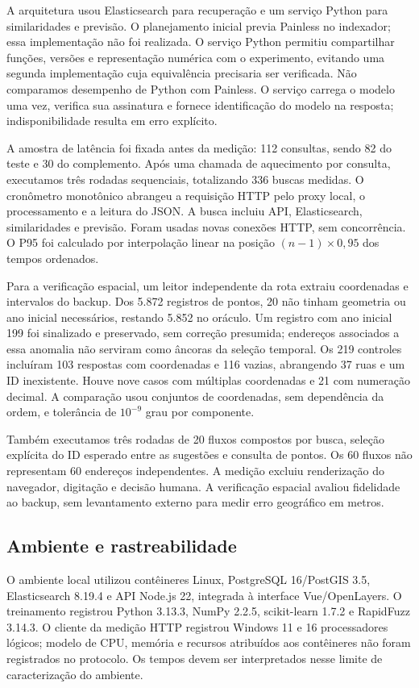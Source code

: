 A arquitetura usou Elasticsearch para recuperação e um serviço Python para similaridades e previsão. O planejamento inicial previa Painless no indexador; essa implementação não foi realizada. O serviço Python permitiu compartilhar funções, versões e representação numérica com o experimento, evitando uma segunda implementação cuja equivalência precisaria ser verificada. Não comparamos desempenho de Python com Painless. O serviço carrega o modelo uma vez, verifica sua assinatura e fornece identificação do modelo na resposta; indisponibilidade resulta em erro explícito.

A amostra de latência foi fixada antes da medição: 112 consultas, sendo 82 do teste e 30 do complemento. Após uma chamada de aquecimento por consulta, executamos três rodadas sequenciais, totalizando 336 buscas medidas. O cronômetro monotônico abrangeu a requisição HTTP pelo proxy local, o processamento e a leitura do JSON. A busca incluiu API, Elasticsearch, similaridades e previsão. Foram usadas novas conexões HTTP, sem concorrência. O P95 foi calculado por interpolação linear na posição $(n-1)\times0{,}95$ dos tempos ordenados.

Para a verificação espacial, um leitor independente da rota extraiu coordenadas e intervalos do backup. Dos 5.872 registros de pontos, 20 não tinham geometria ou ano inicial necessários, restando 5.852 no oráculo. Um registro com ano inicial 199 foi sinalizado e preservado, sem correção presumida; endereços associados a essa anomalia não serviram como âncoras da seleção temporal. Os 219 controles incluíram 103 respostas com coordenadas e 116 vazias, abrangendo 37 ruas e um ID inexistente. Houve nove casos com múltiplas coordenadas e 21 com numeração decimal. A comparação usou conjuntos de coordenadas, sem dependência da ordem, e tolerância de $10^{-9}$ grau por componente.

Também executamos três rodadas de 20 fluxos compostos por busca, seleção explícita do ID esperado entre as sugestões e consulta de pontos. Os 60 fluxos não representam 60 endereços independentes. A medição excluiu renderização do navegador, digitação e decisão humana. A verificação espacial avaliou fidelidade ao backup, sem levantamento externo para medir erro geográfico em metros.

\subsection{Ambiente e rastreabilidade}

O ambiente local utilizou contêineres Linux, PostgreSQL 16/PostGIS 3.5, Elasticsearch 8.19.4 e API Node.js 22, integrada à interface Vue/OpenLayers. O treinamento registrou Python 3.13.3, NumPy 2.2.5, scikit-learn 1.7.2 e RapidFuzz 3.14.3. O cliente da medição HTTP registrou Windows 11 e 16 processadores lógicos; modelo de CPU, memória e recursos atribuídos aos contêineres não foram registrados no protocolo. Os tempos devem ser interpretados nesse limite de caracterização do ambiente.

